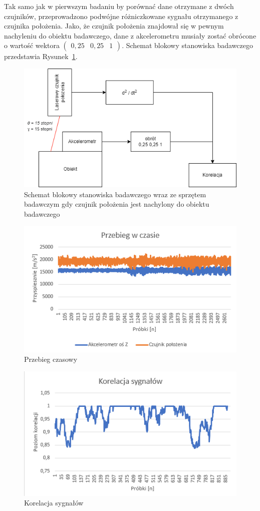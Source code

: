 \documentclass[a4paper, 12pt]{mwart}
\begin{document}
Tak samo jak w pierwszym badaniu by porównać dane otrzymane z dwóch czujników, przeprowadzono podwójne różniczkowane sygnału otrzymanego z czujnika położenia. Jako, że czujnik położenia znajdował się w pewnym nachyleniu do obiektu badawczego, dane z akcelerometru musiały zostać obrócone o wartość wektora $ \begin{pmatrix}0,25 & 0,25 & 1\end{pmatrix} $. Schemat blokowy stanowiska badawczego przedstawia Rysunek~\ref{fig:wibro2}.



\begin{figure}[th]
	\centering
	\includegraphics[width=0.9\linewidth]{assets/wibro2}
	\caption{Schemat blokowy stanowiska badawczego wraz ze sprzętem badawczym gdy czujnik położenia jest nachylony do obiektu badawczego}
	\label{fig:wibro2}
\end{figure}


\begin{figure}[h]
	\centering
	\includegraphics[width=0.9\linewidth]{assets/timePlot2}
	\caption{Przebieg czasowy}
	\label{fig:timeplot2}
\end{figure}

\begin{figure}[h]
	\centering
	\includegraphics[width=0.9\linewidth]{assets/korelacja2}
	\caption{Korelacja sygnałów}
	\label{fig:korelacja2}
\end{figure}
\end{document}
